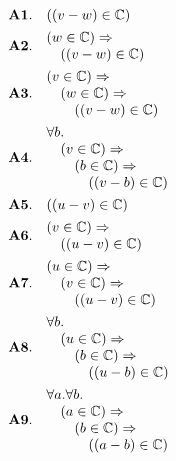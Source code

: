 \documentclass[11pt]{article}
\theoremstyle{plain}
\begin{document}
\begin{align*}
  \mathbf{A1.}\quad & ((v - w) \in \mathbb{C}) \\
  \mathbf{A2.}\quad & \begin{array}{@{}l@{}} (w \in \mathbb{C}) \Rightarrow  \\ \quad ((v - w) \in \mathbb{C}) \end{array} \\
  \mathbf{A3.}\quad & \begin{array}{@{}l@{}} (v \in \mathbb{C}) \Rightarrow  \\ \quad (w \in \mathbb{C}) \Rightarrow  \\ \quad \quad ((v - w) \in \mathbb{C}) \end{array} \\
  \mathbf{A4.}\quad & \begin{array}{@{}l@{}} \forall b. \\ \quad (v \in \mathbb{C}) \Rightarrow  \\ \quad \quad (b \in \mathbb{C}) \Rightarrow  \\ \quad \quad \quad ((v - b) \in \mathbb{C}) \end{array} \\
  \mathbf{A5.}\quad & ((u - v) \in \mathbb{C}) \\
  \mathbf{A6.}\quad & \begin{array}{@{}l@{}} (v \in \mathbb{C}) \Rightarrow  \\ \quad ((u - v) \in \mathbb{C}) \end{array} \\
  \mathbf{A7.}\quad & \begin{array}{@{}l@{}} (u \in \mathbb{C}) \Rightarrow  \\ \quad (v \in \mathbb{C}) \Rightarrow  \\ \quad \quad ((u - v) \in \mathbb{C}) \end{array} \\
  \mathbf{A8.}\quad & \begin{array}{@{}l@{}} \forall b. \\ \quad (u \in \mathbb{C}) \Rightarrow  \\ \quad \quad (b \in \mathbb{C}) \Rightarrow  \\ \quad \quad \quad ((u - b) \in \mathbb{C}) \end{array} \\
  \mathbf{A9.}\quad & \begin{array}{@{}l@{}} \forall a. \forall b. \\ \quad (a \in \mathbb{C}) \Rightarrow  \\ \quad \quad (b \in \mathbb{C}) \Rightarrow  \\ \quad \quad \quad ((a - b) \in \mathbb{C}) \end{array} \\

\end{align*}
\end{document}
